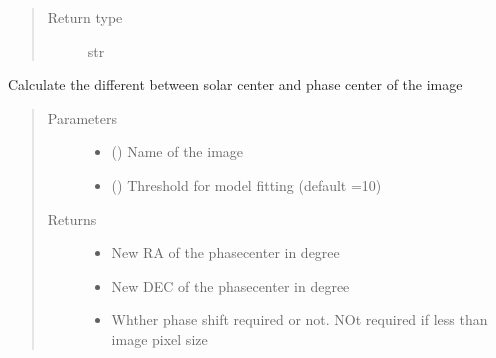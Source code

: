 \documentclass[letterpaper,10pt,english]{sphinxmanual}
\begin{document}
\begin{fulllineitems}
\begin{fulllineitems}
\begin{quote}
\begin{description}
\item[{Return type}] \leavevmode
\sphinxAtStartPar
str

\end{description}\end{quote}

\end{fulllineitems}


\begin{fulllineitems}
\label{\detokenize{paircars:paircars.intensity_selfcal_LTS.IntensitySelfcal.cal_solar_phaseshift}}
\sphinxAtStartPar
Calculate the different between solar center and phase center of the image
\begin{quote}\begin{description}
\item[{Parameters}] \leavevmode\begin{itemize}
\item {} 
\sphinxAtStartPar
{} () \textendash{} Name of the image

\item {} 
\sphinxAtStartPar
{} () \textendash{} Threshold for model fitting (default =10)

\end{itemize}

\item[{Returns}] \leavevmode
\sphinxAtStartPar
\begin{itemize}
\item {} 
\sphinxAtStartPar
{} \textendash{} New RA of the phasecenter in degree

\item {} 
\sphinxAtStartPar
{} \textendash{} New DEC of the phasecenter in degree

\item {} 
\sphinxAtStartPar
{} \textendash{} Whther phase shift required or not. NOt required if less than image pixel size


\end{itemize}
\end{description}
\end{quote}
\end{fulllineitems}
\end{fulllineitems}
\end{document}
